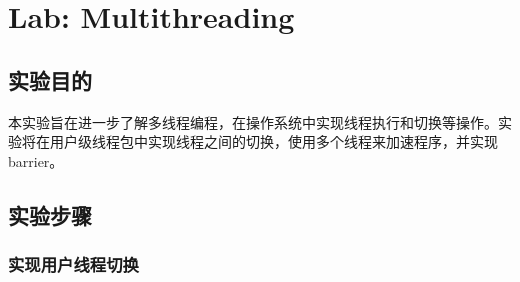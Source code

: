 \section{Lab: Multithreading}

\subsection{实验目的}
本实验旨在进一步了解多线程编程，在操作系统中实现线程执行和切换等操作。实验将在用户级线程包中实现线程之间的切换，使用多个线程来加速程序，并实现barrier。

\subsection{实验步骤}
\subsubsection{实现用户线程切换}
